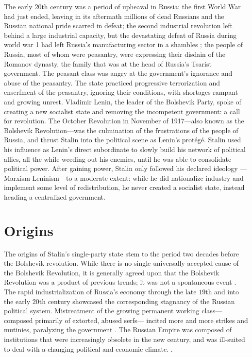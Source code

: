 \documentclass[a4paper,12pt]{article}
\begin{document}
    
    

    The early $20$th century was a period of upheaval in Russia: the first World War had just ended,
    leaving in its aftermath millions of dead Russians and the Russian national pride scarred in
    defeat; the second industrial revolution left behind a large industrial capacity, but the
    devastating defeat of Russia during world war 1 had left Russia's manufacturing sector in a
    shambles \cite[39]{danielsr}; the people of Russia, most of whom were peasantry, were expressing
    their disdain of the Romanov dynasty, the family that was at the head of Russia's Tsarist
    government. The peasant class was angry at the government's ignorance and abuse of the
    peasantry. The state practiced progressive terrorization and enserfment of the peasantry,
    ignoring their conditions, with shortages rampant and growing unrest. Vladimir Lenin, the leader
    of the Bolshevik Party, spoke of creating a new socialist state and removing the incompetent
    government: a call for revolution. The October Revolution in November of 1917---also known as
    the Bolshevik Revolution---was the culmination of the frustrations of the people of Russia, and
    thrust Stalin into the political scene as Lenin's protégé. Stalin used his influence as Lenin's
    direct subordinate to slowly build his network of political allies, all the while weeding out
    his enemies, until he was able to consolidate political power. After gaining power, Stalin only
    followed his declared ideology ---Marxism-Leninism---to a moderate extent: while he did
    nationalize industry and implement some level of redistribution, he never created a socialist
    state, instead heading a centralized government.


    \section{Origins}

        The origins of Stalin's single-party state stem to the period two decades before the
        Bolshevik revolution. While there is no single universally accepted cause of the Bolshevik
        Revolution, it is generally agreed upon that the Bolshevik Revolution was a product of
        previous trends; it was not a spontaneous event \cite[331]{danielsr}. The rapid
        industrialization of Russia's economy through the late $19$th and into the early $20$th
        century showcased the corresponding stagnancy of the Russian political system. Mistreatment
        of the growing permanent working class---composed primarily of extorted, abused serfs---
        incited more and more strikes and mutinies, paralyzing the government \cite[32]{``The
        Bolshevik Revolution''}. The Russian Empire was composed of institutions that were
        increasingly obsolete in the new century, and was ill-suited to deal with a changing
        political and economic climate. \cite[18]{pitirims}.
\end{document}
